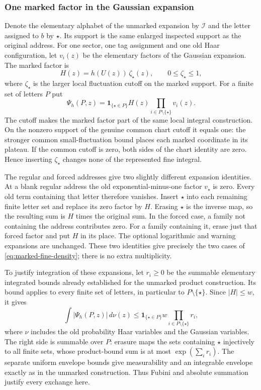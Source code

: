 \subsubsection{One marked factor in the Gaussian expansion}
Denote the elementary alphabet of the unmarked expansion by
$\mathcal I$ and the letter assigned to $b$ by $\star$. Its support
is the same enlarged inspected support as the original address.
For one sector, one tag assignment and one old Haar configuration,
let $v_i(z)$ be the elementary factors of the Gaussian expansion.
The marked factor is
\[
 H(z)=h(U(z))\,\zeta_\star(z),\qquad 0\le\zeta_\star\le1,
\]
where $\zeta_\star$ is the larger local fluctuation cutoff on the
marked support. For a finite set of letters $P$ put
\begin{equation}\label{eq:marked-letter-product}
 \Psi_h(P,z)=\mathbf1_{\{\star\in P\}}H(z)
                          \prod_{i\in P\setminus\{\star\}}v_i(z).
\end{equation}
The cutoff makes the marked factor part of the same local integral
construction. On the nonzero support of the genuine common chart
cutoff it equals one: the stronger common small-fluctuation bound
places each marked coordinate in its plateau. If the common cutoff
is zero, both sides of the chart identity are zero. Hence inserting
$\zeta_\star$ changes none of the represented fine integral.

The regular and forced addresses give two slightly different
expansion identities. At a blank regular address the old
exponential-minus-one factor $v_\star$ is zero. Every old term
containing that letter therefore vanishes. Insert $\star$ into each
remaining finite letter set and replace its zero factor by $H$.
Erasing $\star$ is the inverse map, so the resulting sum is $H$
times the original sum. In the forced case, a family not containing
the address contributes zero. For a family containing it, erase
just that forced factor and put $H$ in its place. The optional
logarithmic and warning expansions are unchanged. These two
identities give precisely the two cases of
\eqref{eq:marked-fine-density}; there is no extra multiplicity.

To justify integration of these expansions, let $r_i\ge0$ be the
summable elementary integrated bounds already established for the
unmarked product construction. Its bound applies to every finite
set of letters, in particular to $P\setminus\{\star\}$. Since
$|H|\le w$, it gives
\begin{equation}\label{eq:marked-integrated-price}
 \int|\Psi_h(P,z)|\,d\nu(z)
 \le \mathbf1_{\{\star\in P\}}w
                            \prod_{i\in P\setminus\{\star\}}r_i,
\end{equation}
where $\nu$ includes the old probability Haar variables and the
Gaussian variables. The right side is summable over $P$: erasure
maps the sets containing $\star$ injectively to all finite sets,
whose product-bound sum is at most $\exp(\sum_i r_i)$.
The separate uniform envelope bounds give measurability and an
integrable envelope exactly as in the unmarked construction.
Thus Fubini and absolute summation justify every exchange here.

